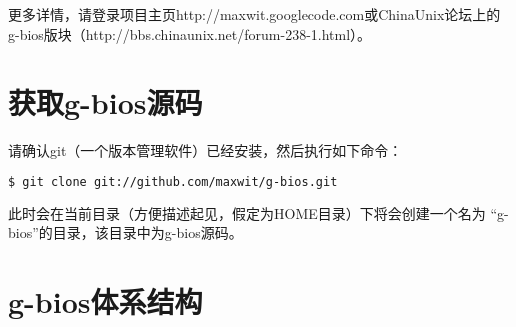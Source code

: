 更多详情，请登录项目主页http://maxwit.googlecode.com或ChinaUnix论坛上的g-bios版块（http://bbs.chinaunix.net/forum-238-1.html）。

\section{获取g-bios源码}
请确认git（一个版本管理软件）已经安装，然后执行如下命令：
\begin{lstlisting}[language=bash,numbers=none]
$ git clone git://github.com/maxwit/g-bios.git
\end{lstlisting}
此时会在当前目录（方便描述起见，假定为HOME目录）下将会创建一个名为 ``g-bios''的目录，该目录中为g-bios源码。

\section{g-bios体系结构}
